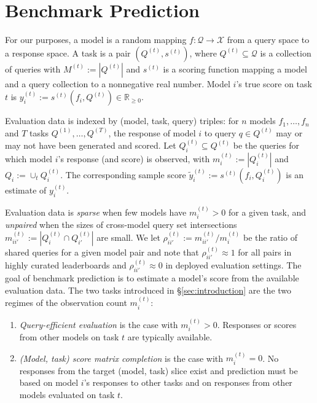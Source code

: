 \documentclass{article}
\theoremstyle{definition}
\theoremstyle{plain}
\begin{document}
\section{Benchmark Prediction}
\label{sec:setting}
For our purposes, a model is a random mapping
$f:\mathcal{Q}\to\mathcal{X}$ from a query space to a response space.
A task is a pair $(Q^{(t)}, s^{(t)})$, where $Q^{(t)}\subseteq\mathcal{Q}$ is a
collection of queries with $M^{(t)}:=|Q^{(t)}|$ and $s^{(t)}$ is a scoring function
mapping a model and a query collection to a nonnegative real number.
Model $i$'s true score on task
$t$ is $y_i^{(t)}:=s^{(t)}(f_{i},Q^{(t)}) \in \mathbb{R}_{\ge 0}$.

Evaluation data is indexed by (model, task, query) triples: for $n$ models
$f_1,\dots,f_n$ and $T$ tasks $Q^{(1)},\dots,Q^{(T)}$, the response of model $i$ to
query $q\in Q^{(t)}$ may or may not have been generated and scored.
Let $Q_{i}^{(t)}\subseteq Q^{(t)}$ be the queries for which model $i$'s response (and score) is
observed, with $m_{i}^{(t)}:=|Q^{(t)}_{i}|$ and $Q_i:=\cup_{t}Q_i^{(t)}$.
The corresponding sample score
$\tilde{y}_{i}^{(t)}:=s^{(t)}(f_{i},Q_{i}^{(t)})$ is an estimate of
$y_{i}^{(t)}$.

Evaluation data is \emph{sparse} when few models have
$m_{i}^{(t)}>0$ for a given task, and \emph{unpaired} when the sizes of cross-model query set intersections
$m_{ii'}^{(t)}:=|Q_{i}^{(t)}\cap Q_{i'}^{(t)}|$ are small. We let
$\rho_{ii'}^{(t)}:=m_{ii'}^{(t)}/m_{i}^{(t)}$ be the ratio of shared queries for a
given model pair and note that $\rho_{ii'}^{(t)}\approx1$ for all pairs in highly curated
leaderboards and $\rho_{ii'}^{(t)}\approx0$ in deployed evaluation settings.
The goal of benchmark prediction is to estimate a model's score from the available
evaluation data.
The two tasks introduced in \S\ref{sec:introduction} are the two regimes of the
observation count $m_i^{(t)}$:
\begin{enumerate}[wide, labelwidth=1pt, labelindent=12pt]
\setlength{\itemsep}{1pt}\setlength{\parskip}{0pt}
\item \emph{Query-efficient evaluation} is the case
with $m_{i}^{(t)}>0$. Responses or scores from other models on task $t$ are
typically available.
\item \emph{(Model, task) score matrix completion} is the case with $m_{i}^{(t)}=0$.
No responses from the target (model, task) slice exist and prediction
must be based on model $i$'s responses to other tasks and on responses from
other models evaluated on task $t$.
\end{enumerate}
\end{document}
